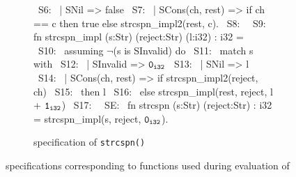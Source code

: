 \begin{figure}[H]
\begin{subfigure}[b]{\textwidth}
\begin{center}
\begin{allLangEnvFoot}
~{\tiny \textcolor{mygray}{S6:\phantom{ }}}~   | SNil => false
~{\tiny \textcolor{mygray}{S7:\phantom{ }}}~   | SCons(ch, rest) => if ch == c then true else strcspn_impl2(rest, c).
~{\tiny \textcolor{mygray}{S8:\phantom{ }}}~ 
~{\tiny \textcolor{mygray}{S9:\phantom{ }}}~ fn strcspn_impl (s:Str) (reject:Str) (l:i32) : i32 =
~{\tiny \textcolor{mygray}{S10:}}~   assuming $\neg$(s is SInvalid) do
~{\tiny \textcolor{mygray}{S11:}}~   match s with
~{\tiny \textcolor{mygray}{S12:}}~   | SInvalid => ${\tt 0_{i32}}$
~{\tiny \textcolor{mygray}{S13:}}~   | SNil => l
~{\tiny \textcolor{mygray}{S14:}}~   | SCons(ch, rest) => if strcspn_impl2(reject, ch)
~{\tiny \textcolor{mygray}{S15:}}~                        then l
~{\tiny \textcolor{mygray}{S16:}}~                        else strcspn_impl(rest, reject, l + ${\tt 1_{i32}}$)
~{\tiny \textcolor{mygray}{S17:}}~ 
~{\tiny \textcolor{mygray}{SE:\phantom{ }}}~ fn strcspn (s:Str) (reject:Str) : i32 = strcspn_impl(s, reject, ${\tt 0_{i32}}$).
\end{allLangEnvFoot}
\end{center}
\caption{\SpecL{} specification of {\tt strcspn()}}
\end{subfigure}
\caption{\label{fig:specifications}\SpecL{} specifications corresponding to functions used during evaluation of \toolName{}}
\end{figure}
